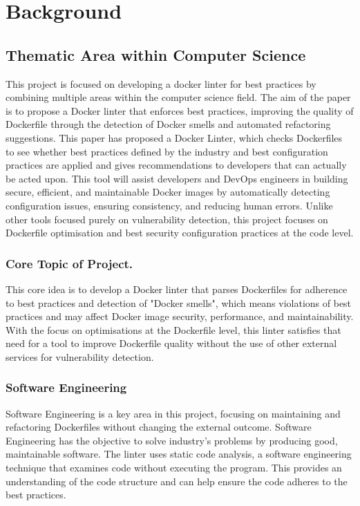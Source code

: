 \chapter{Background}
\label{chap:background}
\section{Thematic Area within Computer Science}
This project is focused on developing a docker linter for best practices by combining multiple areas within the computer science field. 
The aim of the paper is to propose a Docker linter that enforces best practices, improving the quality of Dockerfile through the detection of Docker smells and automated refactoring suggestions. This paper has proposed a Docker Linter, which checks Dockerfiles to see whether best practices defined by the industry and best configuration practices are applied and gives recommendations to developers that can actually be acted upon. This tool will assist developers and DevOps engineers in building secure, efficient, and maintainable Docker images by automatically detecting configuration issues, ensuring consistency, and reducing human errors. Unlike other tools focused purely on vulnerability detection, this project focuses on Dockerfile optimisation and best security configuration practices at the code level.
\subsection{Core Topic of Project.}
    This core idea is to develop a Docker linter that parses Dockerfiles for adherence to best practices and detection of "Docker smells", which means violations of best practices and may affect Docker image security, performance, and maintainability. With the focus on optimisations at the Dockerfile level, this linter satisfies that need for a tool to improve Dockerfile quality without the use of other external services for vulnerability detection.\cite{StudyofDockerSmells}
    
\subsection{Software Engineering}
    Software Engineering is a key area in this project, focusing on maintaining and refactoring Dockerfiles without changing the external outcome.
    Software Engineering has the objective to solve industry's problems by producing good, maintainable software.\cite{softwareEng}
    The linter uses static code analysis, a software engineering technique that examines code without executing the program. This provides an understanding of the code structure and can help ensure the code adheres to the best practices. 
    
